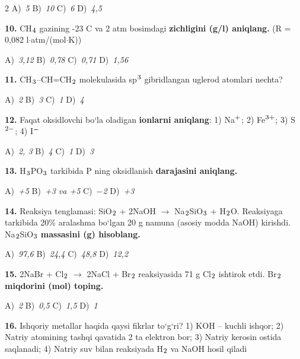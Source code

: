 \documentclass[11pt,a4paper]{article}
\renewcommand{\textsubscript}[1]{\ensuremath{_{\text{\fontsize{8}{8}\selectfont #1}}}}
\renewcommand{\textsuperscript}[1]{\ensuremath{^{\text{\fontsize{8}{8}\selectfont #1}}}}
\begin{document}
\begin{multicols}{2}
\noindent A)~\textsl{5} \hfill B)~\textsl{10} \hfill C)~\textsl{6} \hfill D)~\textsl{4,5}\par
\vspace{4pt}
\noindent\textbf{10.} CH\textsubscript{4} gazining -23 \textdegree{}C va 2 atm bosimdagi \textbf{zichligini (g/l) aniqlang.} (R = 0,082 l$\cdot$atm/(mol$\cdot$K))

\noindent A)~\textsl{3,12} \hfill B)~\textsl{0,78} \hfill C)~\textsl{0,71} \hfill D)~\textsl{1,56}\par
\vspace{4pt}
\noindent\textbf{11.} CH\textsubscript{3}--CH=CH\textsubscript{2} molekulasida sp\textsuperscript{3} gibridlangan uglerod atomlari nechta?

\noindent A)~\textsl{2} \hfill B)~\textsl{3} \hfill C)~\textsl{1} \hfill D)~\textsl{4}\par
\vspace{4pt}
\noindent\textbf{12.} Faqat oksidlovchi bo`la oladigan \textbf{ionlarni aniqlang}: 1) Na\textsuperscript{+}; 2) Fe\textsuperscript{3+}; 3) S\textsuperscript{2$-$}; 4) I\textsuperscript{$-$}

\noindent A)~\textsl{2, 3} \hfill B)~\textsl{4} \hfill C)~\textsl{1} \hfill D)~\textsl{3}\par
\vspace{4pt}
\noindent\textbf{13.} H\textsubscript{3}PO\textsubscript{3} tarkibida P ning oksidlanish \textbf{darajasini aniqlang.}

\noindent A)~\textsl{+5} \hfill B)~\textsl{+3 va +5} \hfill C)~\textsl{$-$2} \hfill D)~\textsl{+3}\par
\vspace{4pt}
\noindent\textbf{14.} Reaksiya tenglamasi: SiO\textsubscript{2} + 2NaOH $\to$ Na\textsubscript{2}SiO\textsubscript{3} + H\textsubscript{2}O. Reaksiyaga tarkibida 20\% aralashma bo`lgan 20 g namuna (asosiy modda NaOH) kirishdi. Na\textsubscript{2}SiO\textsubscript{3} \textbf{massasini (g) hisoblang.}

\noindent A)~\textsl{97,6} \hfill B)~\textsl{24,4} \hfill C)~\textsl{48,8} \hfill D)~\textsl{12,2}\par
\vspace{4pt}
\noindent\textbf{15.} 2NaBr + Cl\textsubscript{2} $\to$ 2NaCl + Br\textsubscript{2} reaksiyasida 71 g Cl\textsubscript{2} ishtirok etdi. Br\textsubscript{2} \textbf{miqdorini (mol) toping.}

\noindent A)~\textsl{2} \hfill B)~\textsl{0,5} \hfill C)~\textsl{1,5} \hfill D)~\textsl{1}\par
\vspace{4pt}
\noindent\textbf{16.} Ishqoriy metallar haqida qaysi fikrlar to`g`ri? 1) KOH -- kuchli ishqor; 2) Natriy atomining tashqi qavatida 2 ta elektron bor; 3) Natriy kerosin ostida saqlanadi; 4) Natriy suv bilan reaksiyada H\textsubscript{2} va NaOH hosil qiladi


\end{multicols}
\end{document}
